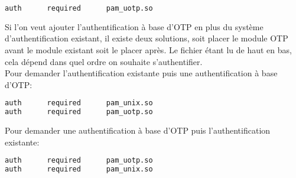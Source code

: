\documentclass{"../../../res/univ-projet"}
\begin{document}
\begin{lstlisting}[language=bash, backgroundcolor=\color{black}, basicstyle=\color{white}]
auth      required      pam_uotp.so 
\end{lstlisting}

Si l'on veut ajouter l'authentification à base d'OTP en plus du système 
d'authentification existant, il existe deux solutions, soit placer le module OTP 
avant le module existant soit le placer après. Le fichier étant lu de haut en bas, 
cela dépend dans quel ordre on souhaite s'authentifier.\\
Pour demander l'authentification existante puis une authentification à base d'OTP: 
\begin{lstlisting}[language=bash, backgroundcolor=\color{black}, basicstyle=\color{white}]
auth      required      pam_unix.so
auth      required      pam_uotp.so
\end{lstlisting}

Pour demander une authentification à base d'OTP puis l'authentification existante:
\begin{lstlisting}[language=bash, backgroundcolor=\color{black}, basicstyle=\color{white}]
auth      required      pam_uotp.so
auth      required      pam_unix.so
\end{lstlisting}

\newpage 
\end{document}
